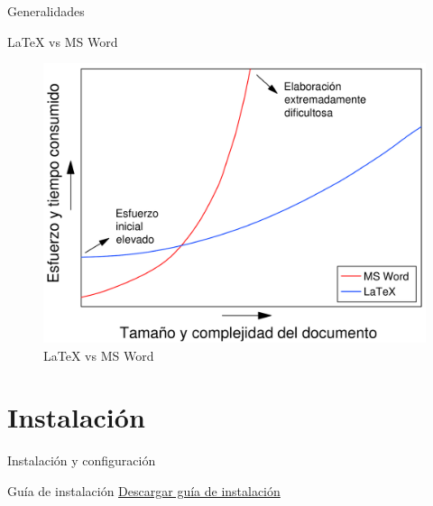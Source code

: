 \documentclass[10pt]{beamer}
\begin{document}
\begin{frame}{Generalidades}
	\begin{block}{\LaTeX{} vs MS Word}
		\begin{figure}
			\centering
			\includegraphics[scale=.3]{figures/LaTeX_vs_Word.pdf}
			\caption{\LaTeX{} vs MS Word}
		\end{figure}
	\end{block}
\end{frame}

\section{Instalación}
\begin{frame}{Instalación y configuración}
	\begin{block}{Guía de instalación}
\href{https://www.dropbox.com/s/8re9ororf9i42et/guia_latex.pdf}{Descargar guía de instalación}
	\end{block}
\end{frame}
\end{document}
